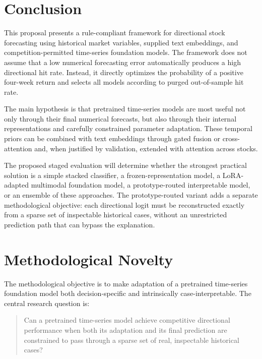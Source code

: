\documentclass[11pt]{article}
\begin{document}
\section{Conclusion}

This proposal presents a rule-compliant framework for directional stock
forecasting using historical market variables, supplied text embeddings, and
competition-permitted time-series foundation models. The framework does not
assume that a low numerical forecasting error automatically produces a high
directional hit rate. Instead, it directly optimizes the probability of a
positive four-week return and selects all models according to purged
out-of-sample hit rate.

The main hypothesis is that pretrained time-series models are most useful not
only through their final numerical forecasts, but also through their internal
representations and carefully constrained parameter adaptation. These temporal
priors can be combined with text embeddings through gated fusion or
cross-attention and, when justified by validation, extended with attention
across stocks.

The proposed staged evaluation will determine whether the strongest practical
solution is a simple stacked classifier, a frozen-representation model, a
LoRA-adapted multimodal foundation model, a prototype-routed interpretable
model, or an ensemble of these approaches. The prototype-routed variant adds a
separate methodological objective: each directional logit must be reconstructed
exactly from a sparse set of inspectable historical cases, without an
unrestricted prediction path that can bypass the explanation.


\section{Methodological Novelty}

The methodological objective is to make adaptation of a pretrained time-series
foundation model both decision-specific and intrinsically case-interpretable.
The central research question is:

\begin{quote}
Can a pretrained time-series model achieve competitive directional performance
when both its adaptation and its final prediction are constrained to pass
through a sparse set of real, inspectable historical cases?
\end{quote}
\end{document}

